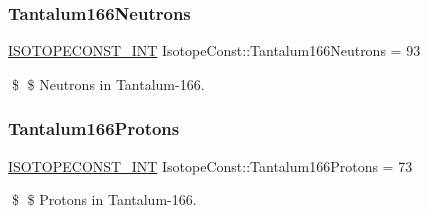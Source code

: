 \subsubsection{\texorpdfstring{Tantalum166\+Neutrons}{Tantalum166Neutrons}}
{\footnotesize\ttfamily \mbox{\hyperlink{group___isotope_const-_macros_ga5f18360b3e99483a35c32d789e62621c}{I\+S\+O\+T\+O\+P\+E\+C\+O\+N\+S\+T\+\_\+\+I\+NT}} Isotope\+Const\+::\+Tantalum166\+Neutrons = 93}

\$ \$ Neutrons in Tantalum-\/166. \mbox{\label{group___isotope_const-_tantalum-_ta166_gaa55259116795b3a73a749ee8d76afbcc}} 
\subsubsection{\texorpdfstring{Tantalum166\+Protons}{Tantalum166Protons}}
{\footnotesize\ttfamily \mbox{\hyperlink{group___isotope_const-_macros_ga5f18360b3e99483a35c32d789e62621c}{I\+S\+O\+T\+O\+P\+E\+C\+O\+N\+S\+T\+\_\+\+I\+NT}} Isotope\+Const\+::\+Tantalum166\+Protons = 73}

\$ \$ Protons in Tantalum-\/166. 
